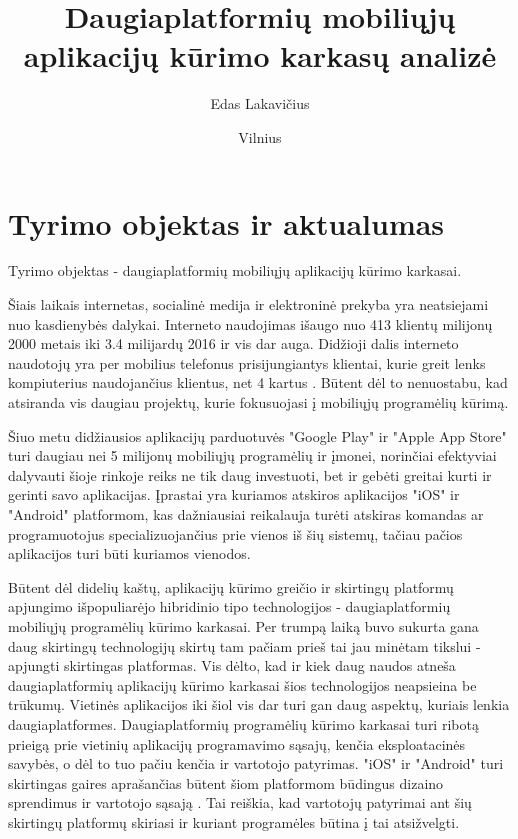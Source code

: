 \documentclass{VUMIFInfBakalaurinis}
\title{Daugiaplatformių mobiliųjų aplikacijų kūrimo karkasų analizė}
\author{Edas Lakavičius}
\date{Vilnius \\ \the\year}
\begin{document}
\maketitle

\tableofcontents

\section{Tyrimo objektas ir aktualumas}
Tyrimo objektas - daugiaplatformių mobiliųjų aplikacijų kūrimo karkasai.

Šiais laikais internetas, socialinė medija ir elektroninė prekyba yra neatsiejami nuo kasdienybės dalykai. Interneto naudojimas išaugo nuo 413 klientų milijonų 2000 metais iki 3.4 milijardų 2016 \cite{owidinternet} ir vis dar auga. Didžioji dalis interneto naudotojų yra per mobilius telefonus prisijungiantys klientai, kurie greit lenks kompiuterius naudojančius klientus, net 4 kartus \cite{internetusage}. Būtent dėl to nenuostabu, kad atsiranda vis daugiau projektų, kurie fokusuojasi į mobiliųjų programėlių kūrimą.

Šiuo metu didžiausios aplikacijų parduotuvės "Google Play" ir "Apple App Store" turi daugiau nei 5 milijonų mobiliųjų programėlių \cite{appcount} ir įmonei, norinčiai efektyviai dalyvauti šioje rinkoje reiks ne tik daug investuoti, bet ir gebėti greitai kurti ir gerinti savo aplikacijas. Įprastai yra kuriamos atskiros aplikacijos "iOS" ir "Android" platformom, kas dažniausiai reikalauja turėti atskiras komandas ar programuotojus specializuojančius prie vienos iš šių sistemų, tačiau pačios aplikacijos turi būti kuriamos vienodos.

Būtent dėl didelių kaštų, aplikacijų kūrimo greičio ir skirtingų platformų apjungimo išpopuliarėjo hibridinio tipo technologijos - daugiaplatformių mobiliųjų programėlių kūrimo karkasai. Per trumpą laiką buvo sukurta gana daug skirtingų technologijų skirtų tam pačiam prieš tai jau minėtam tikslui - apjungti skirtingas platformas. Vis dėlto, kad ir kiek daug naudos atneša daugiaplatformių aplikacijų kūrimo karkasai šios technologijos neapsieina be trūkumų. Vietinės aplikacijos iki šiol vis dar turi gan daug aspektų, kuriais lenkia daugiaplatformes. Daugiaplatformių programėlių kūrimo karkasai turi ribotą prieigą prie vietinių aplikacijų programavimo sąsajų, kenčia eksploatacinės savybės, o dėl to tuo pačiu kenčia ir vartotojo patyrimas. "iOS" ir "Android" turi skirtingas gaires aprašančias būtent šiom platformom būdingus dizaino sprendimus ir vartotojo sąsają \cite{androidui, iosui}. Tai reiškia, kad vartotojų patyrimai ant šių skirtingų platformų skiriasi ir kuriant programėles būtina į tai atsižvelgti.
\end{document}
